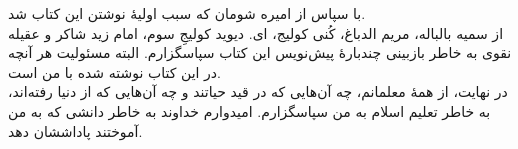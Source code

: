 با سپاس از امیره شومان که سبب اولیهٔ نوشتن این کتاب شد. 
\\
از سمیه بالباله، مریم الدباغ، کُنی کولیج، ای. دیوید کولیجِ سوم، امام زید شاکر و عقیله نقوی به خاطر بازبینی چندبارهٔ پیش‌نویس این کتاب سپاسگزارم. البته مسئولیت هر آنچه در این کتاب نوشته شده با من است. 
\\
در نهایت، از همهٔ معلمانم، چه آن‌هایی که در قید حیاتند و چه آن‌هایی که از دنیا رفته‌اند، به خاطر تعلیم اسلام به من سپاسگزارم.  امیدوارم خداوند به خاطر دانشی که به من آموختند پاداششان دهد.



